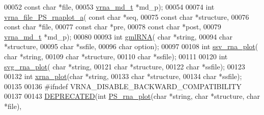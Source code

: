 \begin{DoxyCode}
00052                           \textcolor{keyword}{const} \textcolor{keywordtype}{char} *file,
00053                           \mbox{\hyperlink{group__model__details_structvrna__md__s}{vrna\_md\_t}}  *md\_p);
00054 
00074 \textcolor{keywordtype}{int} \mbox{\hyperlink{plot__structure_8h_a139a31dd0ba9fc6612431f67de901c31}{vrna\_file\_PS\_rnaplot\_a}}( \textcolor{keyword}{const} \textcolor{keywordtype}{char} *seq,
00075                             \textcolor{keyword}{const} \textcolor{keywordtype}{char} *structure,
00076                             \textcolor{keyword}{const} \textcolor{keywordtype}{char} *file,
00077                             \textcolor{keyword}{const} \textcolor{keywordtype}{char} *pre,
00078                             \textcolor{keyword}{const} \textcolor{keywordtype}{char} *post,
00079                             \mbox{\hyperlink{group__model__details_structvrna__md__s}{vrna\_md\_t}}  *md\_p);
00080 
00093 \textcolor{keywordtype}{int} \mbox{\hyperlink{plot__structure_8h_a70834bc8c0aad4fe6824ff76ccb8f329}{gmlRNA}}( \textcolor{keywordtype}{char} *\textcolor{keywordtype}{string},
00094             \textcolor{keywordtype}{char} *structure,
00095             \textcolor{keywordtype}{char} *ssfile,
00096             \textcolor{keywordtype}{char} option);
00097 
00108 \textcolor{keywordtype}{int} \mbox{\hyperlink{plot__structure_8h_add368528755f9a830727b680243541df}{ssv\_rna\_plot}}( \textcolor{keywordtype}{char} *\textcolor{keywordtype}{string},
00109                   \textcolor{keywordtype}{char} *structure,
00110                   \textcolor{keywordtype}{char} *ssfile);
00111 
00120 \textcolor{keywordtype}{int} \mbox{\hyperlink{plot__structure_8h_ae7853539b5df98f294b4af434e979304}{svg\_rna\_plot}}( \textcolor{keywordtype}{char} *\textcolor{keywordtype}{string},
00121                   \textcolor{keywordtype}{char} *structure,
00122                   \textcolor{keywordtype}{char} *ssfile);
00123 
00132 \textcolor{keywordtype}{int} \mbox{\hyperlink{plot__structure_8h_a2f6d5953e6a323df898896b8d6614483}{xrna\_plot}}(\textcolor{keywordtype}{char} *\textcolor{keywordtype}{string},
00133               \textcolor{keywordtype}{char} *structure,
00134               \textcolor{keywordtype}{char} *ssfile);
00135 
00136 \textcolor{preprocessor}{#ifndef VRNA\_DISABLE\_BACKWARD\_COMPATIBILITY}
00137 
00143 \mbox{\hyperlink{plot__structure_8h_aab347a3c03fbe8e7319551b9fa0cce4a}{DEPRECATED}}(\textcolor{keywordtype}{int} \mbox{\hyperlink{plot__structure_8h_a0873c7cc4cd7a11c9a2cea19dde7e9c9}{PS\_rna\_plot}}(\textcolor{keywordtype}{char} *\textcolor{keywordtype}{string}, \textcolor{keywordtype}{char} *structure, \textcolor{keywordtype}{char} *file),

\end{DoxyCode}
